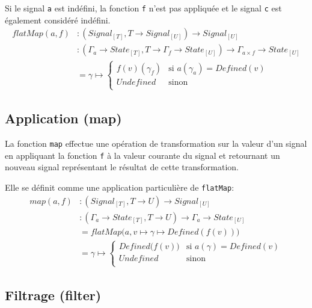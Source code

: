 		Si le signal \texttt{a} est indéfini, la fonction \texttt{f} n'est pas appliquée et le signal \texttt{c} est également considéré indéfini.
		\begin{align*}
			flatMap(a, f)
				&\colon (Signal_{[T]}, T \to Signal_{[U]}) \to Signal_{[U]} \\
				&\colon (\Gamma_a \to State_{[T]}, T \to \Gamma_f \to State_{[U]}) \to \Gamma_{a \times f} \to State_{[U]} \\
				&= \gamma \mapsto \begin{cases}
					f(v)(\gamma_f) & \text{si } a(\gamma_a) = Defined(v)\\
					Undefined & \text{sinon}\\
				\end{cases}
		\end{align*}
	
	\subsection{Application (map)}
	
		La fonction \texttt{map} effectue une opération de transformation sur la valeur d'un signal en appliquant la fonction \texttt{f} à la valeur courante du signal et retournant un nouveau signal représentant le résultat de cette transformation.
		
		\begin{center}
		\end{center}
		
		Elle se définit comme une application particulière de \texttt{flatMap}:
		\begin{align*}
			map(a, f)
				&\colon (Signal_{[T]}, T \to U) \to Signal_{[U]} \\
				&\colon (\Gamma_a \to State_{[T]}, T \to U) \to \Gamma_a \to State_{[U]} \\
				&= flatMap \big( a, v \mapsto \gamma \mapsto Defined(f(v)) \big)\\
				&= \gamma \mapsto \begin{cases}
					Defined \big(f (v) \big) & \text{si } a(\gamma) = Defined(v)\\
					Undefined & \text{sinon}\\
				\end{cases}
		\end{align*}
	
	\subsection{Filtrage (filter)}
	
